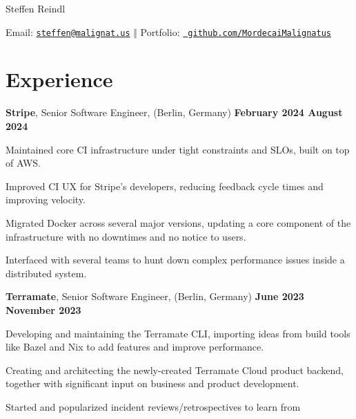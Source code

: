 \documentclass[a4paper]{article}
\def\name{Steffen Reindl}
\renewenvironment{itemize}{
  \begin{list}{}{
      \setlength{\leftmargin}{1em}
      \setlength{\itemsep}{4pt}
  }
}{
\end{list}
}
\newenvironment{positionsList}{
  \begin{itemize}
    \setlength{\itemsep}{20pt}
}{\end{itemize}}
\begin{document}
\begin{minipage}{0.30\linewidth}
  {\huge \name}
\end{minipage}
\begin{minipage}{0.75\linewidth}
  \begin{flushright}
    Email: \href{mailto:steffen@malignat.us}{\tt steffen@malignat.us} $\Vert$
    Portfolio: \href{https://github.com/MordecaiMalignatus/}{\tt
      github.com/MordecaiMalignatus}
  \end{flushright}
\end{minipage}

\section*{Experience}
\begin{positionsList}
\item {\large \textbf{Stripe}, Senior Software Engineer, {\footnotesize(Berlin, Germany)} \hfill \textbf{February 2024 {\textendash} August 2024}}
  \begin{itemize}
  \item Maintained core CI infrastructure under tight constraints and SLOs,
    built on top of AWS.\@
  \item Improved CI UX for Stripe's developers, reducing feedback cycle times
    and improving velocity.
  \item Migrated Docker across several major versions, updating a core component
    of the infrastructure with no downtimes and no notice to users.
  \item Interfaced with several teams to hunt down complex performance issues
    inside a distributed system.
  \end{itemize}
\item {\large \textbf{Terramate}, Senior Software Engineer, {\footnotesize(Berlin, Germany)} \hfill \textbf{June 2023 {\textendash} November 2023}}
  \begin{itemize}
  \item Developing and maintaining the Terramate CLI, importing ideas from build
    tools like Bazel and Nix to add features and improve performance.
  \item Creating and architecting the newly-created Terramate Cloud product
    backend, together with significant input on business and product
    development.
  \item Started and popularized incident reviews/retrospectives to learn from

\end{itemize}
\end{positionsList}
\end{document}
